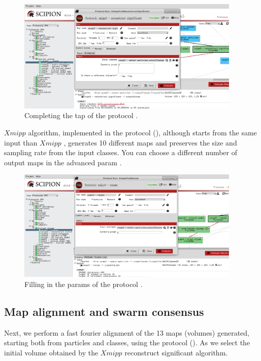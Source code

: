 \begin{figure}[H]
  \centering
  \captionsetup{width=.8\linewidth} 
  \includegraphics[width=0.95\textwidth]
  {images/8d_xmipp3_reconstructSig.pdf}
  \caption{Completing the  tap of the protocol .}
  \label{fig:xmipp_reconstruct_significant}
  \end{figure}

$Xmipp$  algorithm, implemented in the protocol  (), although starts from the same input than $Xmipp$ , generates 10 different maps and preserves the size and sampling rate from the input  classes. You can choose a different number of output maps in the advanced param .

\begin{figure}[H]
  \centering
  \captionsetup{width=.8\linewidth} 
  \includegraphics[width=0.95\textwidth]
  {images/8b_xmipp3_ransac.pdf}
  \caption{Filling in the params of the protocol .}
  \label{fig:xmipp_ransac}
  \end{figure}
  
\subsection*{Map alignment and swarm consensus}
Next, we perform a fast fourier alignment of the 13 maps (volumes) generated, starting both from particles and  classes, using the protocol  (). As  we select the initial volume obtained by the $Xmipp$ reconstruct significant algorithm.

